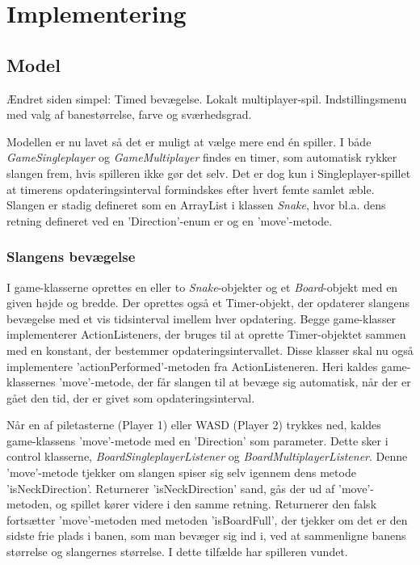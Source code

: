 \section{Implementering}
\subsection{Model}
Ændret siden simpel: Timed bevægelse. Lokalt multiplayer-spil. Indstillingsmenu med valg af banestørrelse, farve og sværhedsgrad.
\newline

Modellen er nu lavet så det er muligt at vælge mere end én spiller. I både \textit{GameSingleplayer} og \textit{GameMultiplayer} findes en timer, som automatisk rykker slangen frem, hvis spilleren ikke gør det selv. Det er dog kun i Singleplayer-spillet at timerens opdateringsinterval formindskes efter hvert femte samlet æble. Slangen er stadig defineret som en ArrayList i klassen \textit{Snake}, hvor bl.a. dens retning defineret ved en 'Direction'-enum er og en 'move'-metode.
\newline

\subsubsection{Slangens bevægelse}
I game-klasserne oprettes en eller to \textit{Snake}-objekter og et \textit{Board}-objekt med en given højde og bredde. Der oprettes også et Timer-objekt, der opdaterer slangens bevægelse med et vis tidsinterval imellem hver opdatering. Begge game-klasser implementerer ActionListeners, der bruges til at oprette Timer-objektet sammen med en konstant, der bestemmer opdateringsintervallet. Disse klasser skal nu også implementere 'actionPerformed'-metoden fra ActionListeneren. Heri kaldes game-klassernes 'move'-metode, der får slangen til at bevæge sig automatisk, når der er gået den tid, der er givet som opdateringsinterval.
\newline

Når en af piletasterne (Player 1) eller WASD (Player 2) trykkes ned, kaldes game-klassens 'move'-metode med en 'Direction' som parameter. Dette sker i control klasserne, \textit{BoardSingleplayerListener} og \textit{BoardMultiplayerListener}. Denne 'move'-metode tjekker om slangen spiser sig selv igennem dens metode 'isNeckDirection'. Returnerer 'isNeckDirection' sand, gås der ud af 'move'-metoden, og spillet kører videre i den samme retning. Returnerer den falsk fortsætter 'move'-metoden med metoden 'isBoardFull', der tjekker om det er den sidste frie plads i banen, som man bevæger sig ind i, ved at sammenligne banens størrelse og slangernes størrelse. I dette tilfælde har spilleren vundet. 
\newline

